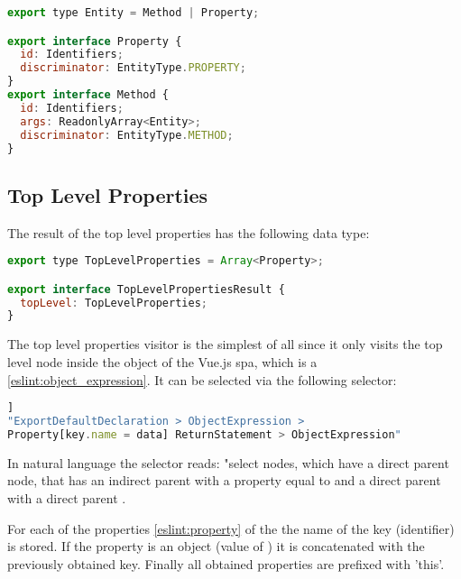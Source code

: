 \begin{lstlisting}[language=JavaScript,caption={Shared data types Property and Method}, captionpos=b]
export type Entity = Method | Property;

export interface Property {
  id: Identifiers;
  discriminator: EntityType.PROPERTY;
}
export interface Method {
  id: Identifiers;
  args: ReadonlyArray<Entity>;
  discriminator: EntityType.METHOD;
}
\end{lstlisting}

\subsection{Top Level Properties}
The result of the top level properties has the following data type:
\begin{lstlisting}[language=JavaScript,caption={Result data type top level properties}, captionpos=b]
export type TopLevelProperties = Array<Property>;

export interface TopLevelPropertiesResult {
  topLevel: TopLevelProperties;
}
\end{lstlisting}

The top level properties visitor is the simplest of all since it only visits the top level  node inside the  object of the Vue.js \gls{spa}, which is a  \ref{eslint:object_expression}. It can be selected via the following selector:

\label{impl:top_level_select}
\begin{lstlisting}[language=JavaScript, caption={Selector top level properties}, captionpos=b]]
"ExportDefaultDeclaration > ObjectExpression > 
Property[key.name = data] ReturnStatement > ObjectExpression"
\end{lstlisting}
In natural language the selector reads: "select  nodes, which have a direct parent node, that has an indirect parent  with a property  equal to  and a direct parent  with a direct parent .

For each of the properties \ref{eslint:property} of the  the name of the key (identifier) is stored. If the property is an object (value of ) it is concatenated with the previously obtained key. Finally all obtained properties are prefixed with 'this'.

